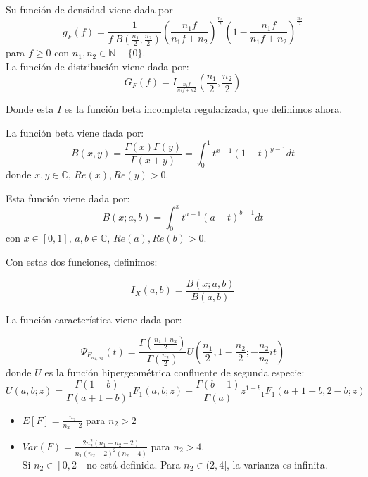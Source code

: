   Su función de densidad viene dada por
  \[
  g_F(f) = \frac{1}{f \ B(\frac{n_1}{2}, \frac{n_2}{2})} (\frac{n_1 f}{n_1 f + n_2})^{\frac{n_1}{2}} (1- \frac{n_1f}{n_1f + n_2})^{\frac{n_2}{2}}
  \]
  para $f \geq 0$ con $n_1,n_2 \in \mathbb N -\{0\}$.\\

  La función de distribución viene dada por:
  \[
G_F(f) = I_{\frac{n_1f}{n_1f + n2}}(\frac{n_1}{2},\frac{n_2}{2})
\]

Donde esta $I$ es la función beta incompleta regularizada, que definimos ahora.

\begin{ndef}
  La función beta viene dada por:
  \[
B(x,y) = \frac{\Gamma(x) \Gamma(y)}{\Gamma(x+y)} = \int_0^1 t^{x-1} (1-t)^{y-1} dt
  \]
  donde $x,y \in \mathbb C$, $Re(x),Re(y) > 0$.
\end{ndef}
\begin{ndef}
  Esta función viene dada por:
  \[
B(x;a,b) = \int_0^x t^{a-1}(a-t)^{b-1} dt
\]
con $x \in [0,1]$, $a,b\in \mathbb C$, $Re(a),Re(b) > 0$.
\end{ndef}
Con estas dos funciones, definimos:
\begin{ndef}
  \[
I_X(a,b) = \frac{B(x;a,b)}{B(a,b)}
  \]
\end{ndef}

\begin{nprop}
  La función característica viene dada por:

  \[
\Psi_{F_{n_1,n_2}}(t) = \frac{\Gamma(\frac{n_1+n_2}{2})}{\Gamma(\frac{n_2}{2})} U(\frac{n_1}{2},1-\frac{n_2}{2}; -\frac{n_2}{n_2}it)
\]
donde $U$ es la función hipergeométrica confluente de segunda especie:
\[
U(a,b;z) = \frac{\Gamma(1-b)}{\Gamma(a+1-b)}{}_1F_1(a,b;z) + \frac{\Gamma(b-1)}{\Gamma(a)}z^{1-b}{}_1F_1(a+1-b,2-b;z)
\]
\end{nprop}

\begin{nprop}
  \begin{itemize}
  \item $E[F] = \frac{n_2}{n_2-2}$ para $n_2 > 2$
  \item $Var(F) = \frac{2 n_2^2(n_1+n_2 - 2)}{n_1(n_2-2)^2 (n_2-4)}$ para $n_2 > 4$.\\

    Si $n_2\in [0,2]$ no está definida. Para $n_2 \in (2,4]$, la varianza es infinita.
  \end{itemize}
\end{nprop}


